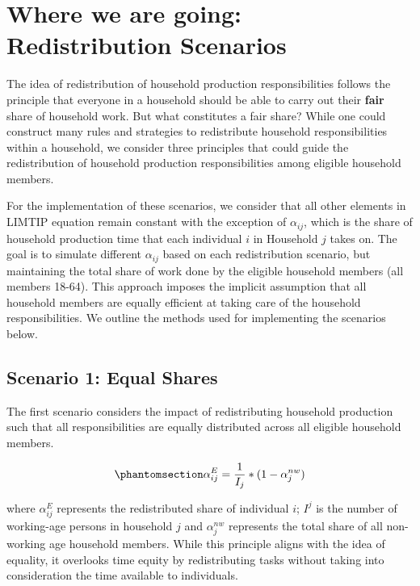 \documentclass[
  11pt,
]{article}
\begin{document}
\section{Where we are going: Redistribution
Scenarios}\label{where-we-are-going-redistribution-scenarios}

The idea of redistribution of household production responsibilities
follows the principle that everyone in a household should be able to
carry out their \textbf{fair} share of household work. But what
constitutes a fair share? While one could construct many rules and
strategies to redistribute household responsibilities within a
household, we consider three principles that could guide the
redistribution of household production responsibilities among eligible
household members.

For the implementation of these scenarios, we consider that all other
elements in LIMTIP equation remain constant with the exception of
\(\alpha_{ij}\), which is the share of household production time that
each individual \(i\) in Household \(j\) takes on. The goal is to
simulate different \(\alpha_{ij}\) based on each redistribution
scenario, but maintaining the total share of work done by the eligible
household members (all members 18-64). This approach imposes the
implicit assumption that all household members are equally efficient at
taking care of the household responsibilities. We outline the methods
used for implementing the scenarios below.

\subsection{Scenario 1: Equal Shares}\label{scenario-1-equal-shares}

The first scenario considers the impact of redistributing household
production such that all responsibilities are equally distributed across
all eligible household members.

\begin{equation}\phantomsection\label{eq-r1}{\alpha_{ij}^E= \frac{1}{I_j}*(1-\alpha_{j}^{nw})
}\end{equation}

where \(\alpha_{ij}^E\) represents the redistributed share of individual
\(i\); \(I^j\) is the number of working-age persons in household \(j\)
and \(\alpha_{j}^{nw}\) represents the total share of all non-working
age household members. While this principle aligns with the idea of
equality, it overlooks time equity by redistributing tasks without
taking into consideration the time available to individuals.
\end{document}
